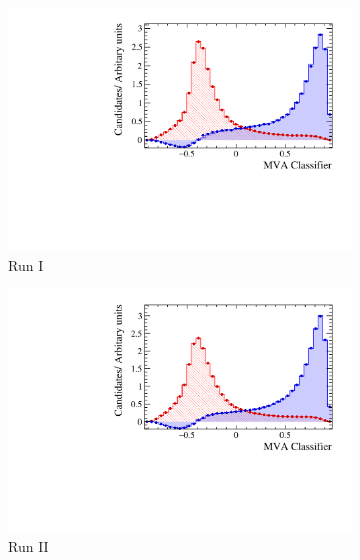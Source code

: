 \begin{figure}[!h]
\begin{subfigure}[t]{0.32\textwidth}
      \includegraphics[width=1.0\textwidth]{figs/Selection/Ds_BDT_classifier_Ds2KKPi_Run1.pdf}
      \caption{Run I \decay{\Dsp}{\Kp\Km\pip}}
   \end{subfigure}
   \begin{subfigure}[t]{0.32\textwidth}
      \centering
      \includegraphics[width=1.0\textwidth]{figs/Selection/Ds_BDT_classifier_Ds2KKPi_Run2.pdf}
      \caption{Run II \decay{\Dsp}{\Kp\Km\pip}}
   \end{subfigure}\\
   \begin{subfigure}[t]{0.32\textwidth}
      \centering

\end{subfigure}
\end{figure}
